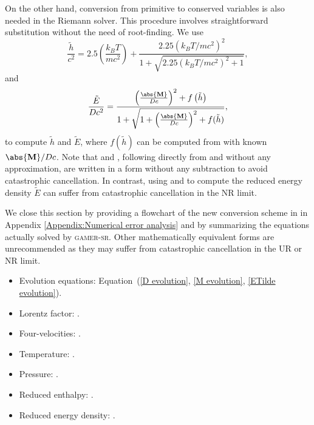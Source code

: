 On the other hand, conversion from primitive to conserved variables is also needed in the Riemann solver. This procedure involves straightforward substitution without the need of root-finding. We use
\begin{equation}
\frac{\tilde{h}}{c^2} = 2.5\left(\frac{k_{B}T}{mc^2}\right)+\frac{2.25\left(k_{B}T/mc^2\right)^2}{1+\sqrt{2.25\left(k_{B}T/mc^2\right)^2+1}},
\label{eq:T_to_HTilde}
\end{equation}
and
\begin{equation}
\frac{\tilde{E}}{Dc^2} = \frac{\left(\frac{\abs{\mathbf{M}}}{Dc}\right)^2+f\left(\tilde{h}\right)}{1+\sqrt{1+\left(\frac{\abs{\mathbf{M}}}{Dc}\right)^2+f(\tilde{h})}},
\label{eq:E_D}
\end{equation}
to compute $\tilde{h}$ and $\tilde{E}$, where $f(\tilde{h})$ can be computed from  with known $\abs{\mathbf{M}}/Dc$. Note that  and , following directly from  and  without any approximation, are written in a form without any subtraction to avoid catastrophic cancellation. In contrast, using  and  to compute the reduced energy density $\tilde{E}$ can suffer from catastrophic cancellation in the NR limit.

We close this section by providing a flowchart of the new conversion scheme in  in Appendix \ref{Appendix:Numerical error analysis} and by summarizing the equations actually solved by \textsc{gamer-sr}. Other mathematically equivalent forms are unrecommended as they may suffer from catastrophic cancellation in the UR or NR limit.
\begin{itemize}
\item Evolution equations: Equation~(\ref{D evolution}, \ref{M evolution}, \ref{ETilde evolution}).
\item Lorentz factor:
.
\item Four-velocities: .
\item Temperature: .
\item Pressure: .
\item Reduced enthalpy: .
\item Reduced energy density: .
\end{itemize}

